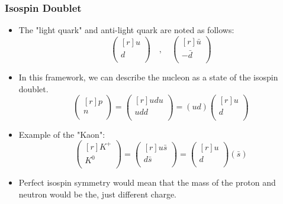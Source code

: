 \subsubsection{Isospin Doublet}
\begin{itemize}
    \item The "light quark" and anti-light quark are noted as follows:
    \begin{equation}
        \begin{pmatrix*}[r]
        u \\
        d \\
        \end{pmatrix*} \quad , \quad \begin{pmatrix*}[r]
        \bar{u} \\
        -\bar{d} \\
        \end{pmatrix*}
    \end{equation} 
    \item In this framework, we can describe the nucleon as a state of the isospin doublet.
    \begin{equation}
        \begin{pmatrix*}[r]
        p \\
        n \\
        \end{pmatrix*} = 
        \begin{pmatrix*}[r]
         udu \\
         udd \\
        \end{pmatrix*} = 
        (ud) 
        \begin{pmatrix*}[r]
         u \\
         d \\
        \end{pmatrix*}
    \end{equation} 
    \item Example of the "Kaon":
    \begin{equation}
        \begin{pmatrix*}[r]
        K^{+} \\
        K^{0} \\
        \end{pmatrix*} = 
        \begin{pmatrix*}[r]
         u \bar{s} \\
         d \bar{s} \\
        \end{pmatrix*} =  
        \begin{pmatrix*}[r]
         u \\
         d \\
        \end{pmatrix*}
        (\bar{s})
    \end{equation} 
    \item Perfect isospin symmetry would mean that the mass of the proton and neutron would be the, just different charge. 
\end{itemize}

